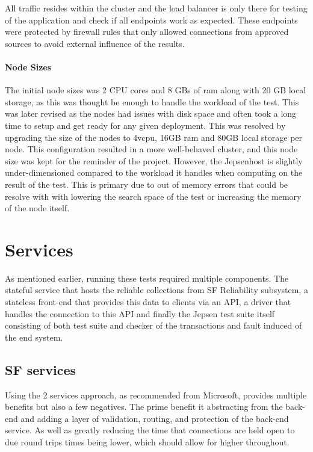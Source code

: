 \documentclass[a4paper,10pt,titlepage]{report}
\begin{document}
    All traffic resides within the cluster and the load balancer is only there for testing of the application and check if all endpoints work as expected. These endpoints were protected by firewall rules that only allowed connections from approved sources to avoid external influence of the results.

    \paragraph*{Node Sizes}

    The initial node sizes was 2 CPU cores and 8 GBs of ram along with 20 GB local storage, as this was thought be enough to handle the workload of the test. This was later revised as the nodes had issues with disk space and often took a long time to setup and get ready for any given deployment. This was resolved by upgrading the size of the nodes to 4vcpu, 16GB ram and 80GB local storage per node. This configuration resulted in a more well-behaved cluster, and this node size was kept for the reminder of the project. However, the Jepsenhost is slightly under-dimensioned compared to the workload it handles when computing on the result of the test. This is primary due to out of memory errors that could be resolve with with lowering the search space of the test or increasing the memory of the node itself.


    \section{Services}
    As mentioned earlier, running these tests required multiple components. The stateful service that hosts the reliable collections from SF Reliability subsystem, a stateless front-end that provides this data to clients via an API, a driver that handles the connection to this API and finally the Jepsen test suite itself consisting of both test suite and checker of the transactions and fault induced of the end system.

    \subsection{SF services}
    Using the 2 services approach, as recommended from Microsoft, provides multiple benefits but also a few negatives. The prime benefit it abstracting from the back-end and adding a layer of validation, routing, and protection of the back-end service. As well as greatly reducing the time that connections are held open to due round trips times being lower, which should allow for higher throughout.
\end{document}
